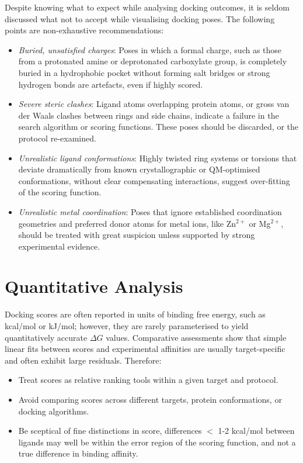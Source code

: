 \documentclass[12pt]{article}
\begin{document}
Despite knowing what to expect while analysing docking outcomes, it is seldom discussed what not to accept while visualising docking poses. The following points are non-exhaustive recommendations:

\begin{itemize}
  \item \emph{Buried, unsatisfied charges}: Poses in which a formal charge, such as those from a protonated amine or deprotonated carboxylate group, is completely buried in a hydrophobic pocket without forming salt bridges or strong hydrogen bonds are artefacts, even if highly scored.
  \item \emph{Severe steric clashes}: Ligand atoms overlapping protein atoms, or gross van der Waals clashes between rings and side chains, indicate a failure in the search algorithm or scoring functions. These poses should be discarded, or the protocol re-examined.
  \item \emph{Unrealistic ligand conformations}: Highly twisted ring systems or torsions that deviate dramatically from known crystallographic or QM-optimised conformations, without clear compensating interactions, suggest over-fitting of the scoring function.
  \item \emph{Unrealistic metal coordination}: Poses that ignore established coordination geometries and preferred donor atoms for metal ions, like Zn$^{2+}$ or Mg$^{2+}$, should be treated with great suspicion unless supported by strong experimental evidence.
\end{itemize}

\section{Quantitative Analysis}

Docking scores are often reported in units of binding free energy, such as kcal/mol or kJ/mol; however, they are rarely parameterised to yield quantitatively accurate $\Delta G$ values. Comparative assessments show that simple linear fits between scores and experimental affinities are usually target-specific and often exhibit large residuals\cite{CH8_Warren2006,CH8_Cheng2009}. Therefore:

\begin{itemize}
  \item Treat scores as relative ranking tools within a given target and protocol.
  \item Avoid comparing scores across different targets, protein conformations, or docking algorithms.
  \item Be sceptical of fine distinctions in score, differences $<$ 1-2 kcal/mol between ligands may well be within the error region of the scoring function, and not a true difference in binding affinity.
\end{itemize}
\end{document}
